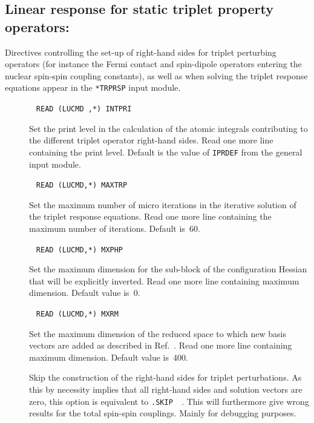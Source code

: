 \subsection{Linear response for static triplet property operators:
}\label{sec:trprsp}

Directives controlling the set-up of right-hand sides for triplet
perturbing operators (for instance the Fermi contact and spin-dipole
operators entering the nuclear spin-spin coupling
constants),
as well as when solving the triplet response equations appear in the
\verb|*TRPRSP| input module.

\begin{description}
\item[]\verb| |\newline
\verb|READ (LUCMD ,*) INTPRI|

Set the print level in the calculation of the atomic integrals
contributing to the different triplet operator right-hand sides. Read
one more line containing the print level. Default is the value
of \verb|IPRDEF| from the general input module.

\item[]\verb| |\newline
\verb|READ (LUCMD,*) MAXTRP|

Set the maximum number of micro iterations in the iterative solution of
the triplet response equations. Read one more line containing the
maximum number of iterations. Default is~60.

\item[]\verb| |\newline
\verb|READ (LUCMD,*) MXPHP|

Set the maximum dimension for the sub-block of the configuration
Hessian that will be explicitly inverted. Read one more line
containing maximum dimension. Default value is~0.

\item[]\verb| |\newline
\verb|READ (LUCMD,*) MXRM|

Set the maximum dimension of the reduced space to which new basis
vectors are added as described in Ref.~\cite{tuhjahjajpjjcp84}. Read
one more line containing maximum dimension. Default value is~400.

\item[] Skip the construction of the right-hand sides
for triplet perturbations. As this by necessity implies that all
right-hand sides and solution vectors are zero, this option is
equivalent to \verb|.SKIP  |. This will furthermore give wrong results
for the total spin-spin couplings. Mainly for debugging purposes.


\end{description}
